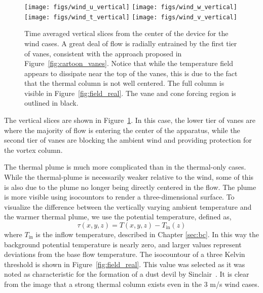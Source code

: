 %
%

\begin{figure}[htb]
  \centering
  \texttt{[image: figs/wind\_u\_vertical]}
  \hfill
  \texttt{[image: figs/wind\_w\_vertical]}
  \\
  \centering
  \texttt{[image: figs/wind\_t\_vertical]}
  \hfill
  \texttt{[image: figs/wind\_v\_vertical]}
  \\
 \caption{Time averaged vertical slices from the center of the device
 for the wind cases. A great deal of flow is radially entrained by the
 first tier of vanes, consistent with the approach proposed in
 Figure~\ref{fig:cartoon_vanes}. Notice that while the temperature field
  appears to dissipate near the top of the vanes, this is due to the
 fact that the thermal column is not well centered. The full column is
 visible in Figure~\ref{fig:field_real}. The vane and cone forcing region is
 outlined in black.}
 \label{fig:wind-ver}
\end{figure}

The vertical slices are shown in Figure~\ref{fig:wind-ver}. In this 
case, the lower tier of vanes are where the majority of flow is 
entering the center of the apparatus, while the second tier of vanes are
blocking the ambient wind and providing protection for the vortex column. 

The thermal plume is much more complicated than in the thermal-only
cases. While the thermal-plume is necessarily weaker relative to the
wind, some of this is also due to the plume no longer being directly
centered in the flow. The plume is more visible using isocountors to
render a three-dimensional surface. 
To visualize the difference between the vertically varying ambient
temperature and the warmer thermal plume, we use the potential
temperature, defined as, 
\begin{equation}
  \tau(x,y,z) = T(x,y,z) -T_{\text{in}}(z) 
   \label{eqn:tau}
\end{equation}
where $T_{\text{in}}$ is the inflow temperature, described
in Chapter \ref{sec:bc}. In this way the background potential
temperature is nearly zero, and larger values represent deviations from
the base flow temperature. The isocountour of a three Kelvin threshold
is  shown in Figure~\ref{fig:field_real}. This value was selected as
it was noted as characteristic for the formation of a dust devil by
Sinclair~\cite{Sinclair1969}. It is clear from the image that a 
strong thermal column exists even in the 3 m/s wind cases. 


